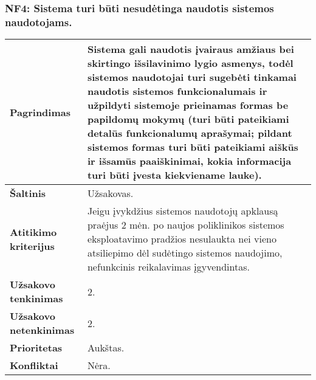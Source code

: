 \documentclass[12pt]{article}
\begin{document}
\subsubsection*{NF4: Sistema turi būti nesudėtinga naudotis sistemos
naudotojams.}
\label{sec:NF4}
\begin{table}[htb!]
    \captionsetup{justification=centering}
    \begin{tabular}{|m{4.9cm}|m{11cm}|}
        \hline
        \raggedleft \textbf{\cellcolor{orange!30}Pagrindimas} &
        Sistema gali naudotis įvairaus amžiaus bei skirtingo išsilavinimo lygio
        asmenys, todėl sistemos naudotojai turi sugebėti tinkamai naudotis
        sistemos funkcionalumais ir užpildyti sistemoje prieinamas formas be
        papildomų mokymų (turi būti pateikiami detalūs funkcionalumų aprašymai;
        pildant sistemos formas turi būti pateikiami aiškūs ir išsamūs
        paaiškinimai, kokia informacija turi būti įvesta kiekviename lauke). \\
        \hline
        \raggedleft \textbf{\cellcolor{orange!30}Šaltinis} & Užsakovas. \\
        \hline
        \raggedleft \textbf{\cellcolor{orange!30}Atitikimo kriterijus} & 
        Jeigu įvykdžius sistemos naudotojų apklausą praėjus 2 mėn. po naujos
        poliklinikos sistemos eksploatavimo pradžios nesulaukta nei vieno
        atsiliepimo dėl sudėtingo sistemos naudojimo, nefunkcinis reikalavimas
        įgyvendintas. \\
        \hline
        \raggedleft \textbf{\cellcolor{orange!30}Užsakovo tenkinimas} & 2. \\
        \hline
        \raggedleft \textbf{\cellcolor{orange!30}Užsakovo netenkinimas} & 2. \\
        \hline
        \raggedleft \textbf{\cellcolor{orange!30}Prioritetas} & Aukštas. \\
        \hline
        \raggedleft \textbf{\cellcolor{orange!30}Konfliktai} & Nėra. \\
        \hline
    \end{tabular}
\end{table}
\end{document}
